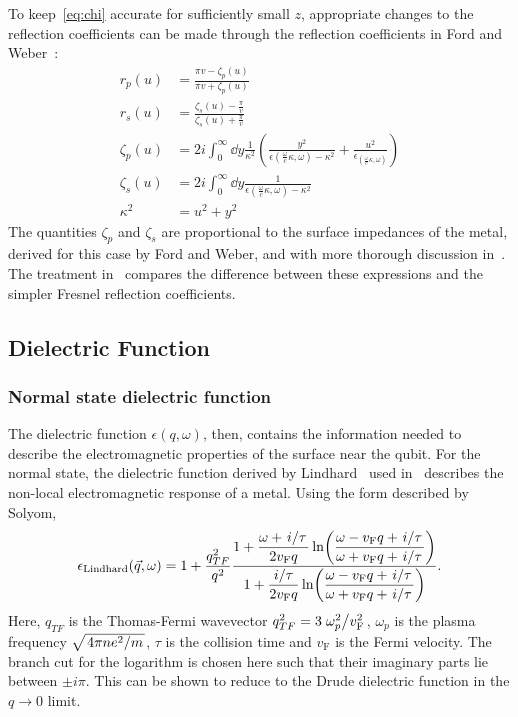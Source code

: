 \documentclass[%
 preprint,
 amsmath,amssymb,
 aps,
]{revtex4-2}
\newcommand{\vf}{v_{\mathrm{F}}}
\begin{document}
To keep~\eqref{eq:chi} accurate for sufficiently small $z$, appropriate changes to the reflection coefficients can be made\cite{QubitRelax,Henkel2006} through the reflection coefficients in Ford and Weber~\cite{Ford1984}:
\begin{align}
	r_p(u) &= \frac{\pi v - \zeta_p(u)}{\pi v + \zeta_p(u)} \\
	r_s(u) &= \frac{\zeta_s(u) - \frac{\pi}{v}}{\zeta_s(u) + \frac{\pi}{v}} \\
	\zeta_p(u) &= 2i \int_0^\infty \dd{y} \frac{1}{\kappa^2} \left( \frac{y^2}{\epsilon(\frac{\omega}{c}\kappa, \omega) - \kappa^2} + \frac{u^2}{\epsilon_(\frac{\omega}{c}\kappa, \omega)} \right) \label{eq:zp} \\
	\zeta_s(u) &= 2i \int_0^\infty \dd{y} \frac{1}{\epsilon(\frac{\omega}{c}\kappa, \omega) - \kappa^2} \label{eq:zs} \\
	\kappa^2 &= u^2 + y^2
\end{align}
The quantities $\zeta_p$ and $\zeta_s$ are proportional to the surface impedances of the metal, derived for this case by Ford and Weber\cite{Ford1984}, and with more thorough discussion in~\cite{LandauLifshitzElectrodynamics}.
The treatment in~\cite{QubitRelax} compares the difference between these expressions and the simpler Fresnel reflection coefficients.

\subsection{Dielectric Function} \label{subsec:dielectric}
\subsubsection{Normal state dielectric function} \label{subsubsec:lindharddielectric}
The dielectric function $\epsilon(q, \omega)$, then, contains the information needed to describe the electromagnetic properties of the surface near the qubit.
For the normal state, the dielectric function derived by Lindhard~\cite{Lindhard} used in~\cite{QubitRelax} describes the non-local electromagnetic response of a metal.
Using the form described by Solyom\cite{SolyomV3},
\begin{equation}
	\epsilon_{\mathrm{Lindhard}}(\vec{q}, \omega) = 1 + \frac{q_{TF}^2}{q^2}\frac{\displaystyle 1 + \frac{\omega + \flatfrac{i}{\tau}}{2 \vf q} \ln(\frac{\omega - \vf q + \flatfrac{i}{\tau}}{\omega + \vf q + \flatfrac{i}{\tau}})}{\displaystyle 1 + \frac{\flatfrac{i}{\tau}}{2 \vf q} \ln(\frac{\omega - \vf q + \flatfrac{i}{\tau}}{\omega + \vf q + \flatfrac{i}{\tau}})}. \label{eq:lindhardsolyom}
\end{equation}
Here, $q_{TF}$ is the Thomas-Fermi wavevector $q_{TF}^2 = 3 \flatfrac{\omega_p^2}{\vf^2}$, $\omega_p$ is the plasma frequency $\sqrt{\flatfrac{4 \pi n e^2}{m}}$, $\tau$ is the collision time and $\vf$ is the Fermi velocity.
The branch cut for the logarithm is chosen here such that their imaginary parts lie between $\pm i \pi$.
This can be shown to reduce to the Drude dielectric function in the $q \rightarrow 0$ limit.
\end{document}
